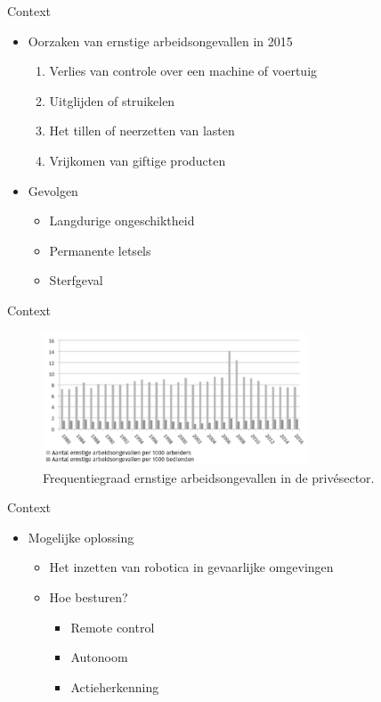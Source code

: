 \documentclass[]{beamer}
\begin{document}
	\begin{frame}{Context}
		\begin{itemize}
			\item Oorzaken van ernstige arbeidsongevallen in 2015
			\begin{enumerate}
				\item Verlies van controle over een machine of voertuig
				\item Uitglijden of struikelen
				\item Het tillen of neerzetten van lasten
				\item Vrijkomen van giftige producten
			\end{enumerate}
			\item<2-> Gevolgen
			\begin{itemize}
				\item Langdurige ongeschiktheid
				\item Permanente letsels
				\item Sterfgeval
			\end{itemize}
		\end{itemize}
	\end{frame}
	\begin{frame}{Context}
		\begin{figure}
			\includegraphics[width=0.7\textwidth]{arbeidsongevallen}
			\caption{Frequentiegraad ernstige arbeidsongevallen in de privésector.}
		\end{figure}
	\end{frame}

	\begin{frame}{Context}
		\begin{itemize}
			\item Mogelijke oplossing
			\begin{itemize}
				\item Het inzetten van robotica in gevaarlijke omgevingen
				\item<2-> Hoe besturen?
				\begin{itemize}
					\item Remote control
					\item Autonoom
					\item Actieherkenning
				\end{itemize}
			\end{itemize}
		\end{itemize}
	\end{frame}
\end{document}
